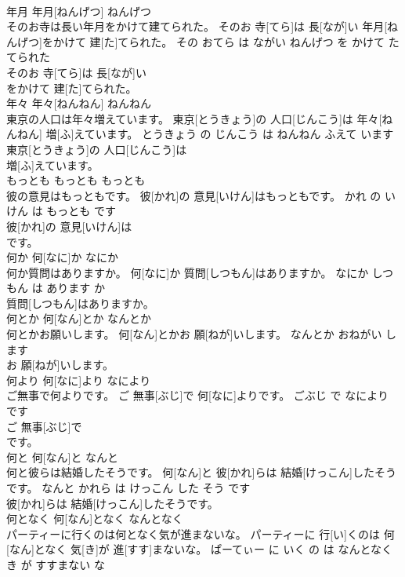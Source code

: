 \documentclass[8pt]{extreport}
\begin{document}
\begin{CJK}{UTF8}{min}
\\	年月	年月[ねんげつ]	ねんげつ	
\\	そのお寺は長い年月をかけて建てられた。	そのお 寺[てら]は 長[なが]い 年月[ねんげつ]をかけて 建[た]てられた。	その おてら は ながい ねんげつ を かけて たてられた	
\\	そのお 寺[てら]は 長[なが]い
\\	をかけて 建[た]てられた。			
\\	年々	年々[ねんねん]	ねんねん	
\\	東京の人口は年々増えています。	東京[とうきょう]の 人口[じんこう]は 年々[ねんねん] 増[ふ]えています。	とうきょう の じんこう は ねんねん ふえて います	
\\	東京[とうきょう]の 人口[じんこう]は
\\	増[ふ]えています。			
\\	もっとも	もっとも	もっとも	
\\	彼の意見はもっともです。	彼[かれ]の 意見[いけん]はもっともです。	かれ の いけん は もっとも です	
\\	彼[かれ]の 意見[いけん]は
\\	です。			
\\	何か	何[なに]か	なにか	
\\	何か質問はありますか。	何[なに]か 質問[しつもん]はありますか。	なにか しつもん は あります か	
\\	質問[しつもん]はありますか。			
\\	何とか	何[なん]とか	なんとか	
\\	何とかお願いします。	何[なん]とかお 願[ねが]いします。	なんとか おねがい します	
\\	お 願[ねが]いします。			
\\	何より	何[なに]より	なにより	
\\	ご無事で何よりです。	ご 無事[ぶじ]で 何[なに]よりです。	ごぶじ で なにより です	
\\	ご 無事[ぶじ]で
\\	です。			
\\	何と	何[なん]と	なんと	
\\	何と彼らは結婚したそうです。	何[なん]と 彼[かれ]らは 結婚[けっこん]したそうです。	なんと かれら は けっこん した そう です	
\\	彼[かれ]らは 結婚[けっこん]したそうです。			
\\	何となく	何[なん]となく	なんとなく	
\\	パーティーに行くのは何となく気が進まないな。	パーティーに 行[い]くのは 何[なん]となく 気[き]が 進[すす]まないな。	ぱーてぃー に いく の は なんとなく き が すすまない な	

\end{CJK}
\end{document}
